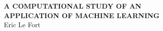 \begin{titlepage}
\begin{changemargin}{0cm}{-1.4cm}
\begin{center}
	\vspace*{6cm}
	\textbf{\Large  A COMPUTATIONAL STUDY OF AN}\\
	\textbf{\Large APPLICATION OF MACHINE LEARNING}
	\vspace{3cm}~\\
	\large Eric Le Fort
\end{center}
\end{changemargin}
\end{titlepage}

